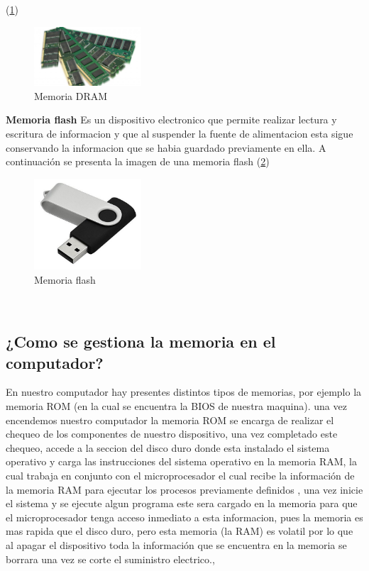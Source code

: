 \documentclass{article}
\begin{document}
(\ref{fig:memoria-DRAM})
\begin{figure}[h]
\includegraphics[width=4cm]{dram.jpg}\centering
\caption{Memoria DRAM}
\label{fig:memoria-DRAM}
\end{figure}
\newline
\newline
\textbf{Memoria flash}
Es un dispositivo electronico que permite realizar lectura y escritura de informacion y que al suspender la fuente de alimentacion esta sigue conservando la informacion que se habia guardado previamente en ella.
\newline
\newline
A continuación se presenta la imagen de una memoria flash
(\ref{fig:memoria-flash})
\begin{figure}[h]
\includegraphics[width=4cm]{memoria-flash.jpg}\centering
\caption{Memoria flash}
\label{fig:memoria-flash}
\end{figure}
\newline
\newline
\

\subsection{¿Como se gestiona la memoria en el computador?}
\newline
En nuestro computador hay presentes distintos tipos de memorias, por ejemplo la memoria ROM (en la cual se encuentra la BIOS de nuestra maquina). una vez encendemos nuestro computador la memoria ROM se encarga de realizar el chequeo de los componentes de nuestro dispositivo, una vez completado este chequeo, accede a la seccion del disco duro donde esta instalado el sistema operativo y carga las instrucciones del sistema operativo en la memoria RAM, la cual  trabaja en conjunto con el microprocesador el cual recibe la información de la memoria RAM para ejecutar los procesos previamente definidos , una vez inicie el sistema y se ejecute algun programa este sera cargado en la memoria para que el microprocesador tenga acceso inmediato a esta informacion, pues la memoria es mas rapida que el disco duro, pero esta memoria (la RAM) es volatil por lo que al apagar el dispositivo toda la información que se encuentra en la memoria se borrara una vez se corte el suministro electrico.\cite{Gestion},\cite{Guia}
\newline
\end{document}
